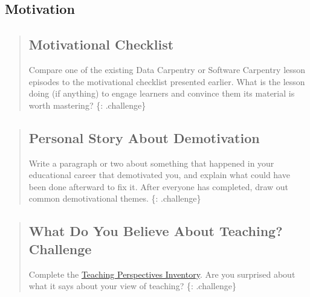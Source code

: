 \subsection{Motivation}\label{motivation}

\begin{quote}
\subsection{Motivational Checklist}\label{motivational-checklist}

Compare one of the existing Data Carpentry or Software Carpentry lesson
episodes to the motivational checklist presented earlier. What is the
lesson doing (if anything) to engage learners and convince them its
material is worth mastering? \{: .challenge\}
\end{quote}

\begin{quote}
\subsection{Personal Story About
Demotivation}\label{personal-story-about-demotivation}

Write a paragraph or two about something that happened in your
educational career that demotivated you, and explain what could have
been done afterward to fix it. After everyone has completed, draw out
common demotivational themes. \{: .challenge\}
\end{quote}

\begin{quote}
\subsection{What Do You Believe About Teaching?
Challenge}\label{what-do-you-believe-about-teaching-challenge}

Complete the \href{http://www.teachingperspectives.com/tpi/}{Teaching
Perspectives Inventory}. Are you surprised about what it says about your
view of teaching? \{: .challenge\}
\end{quote}

